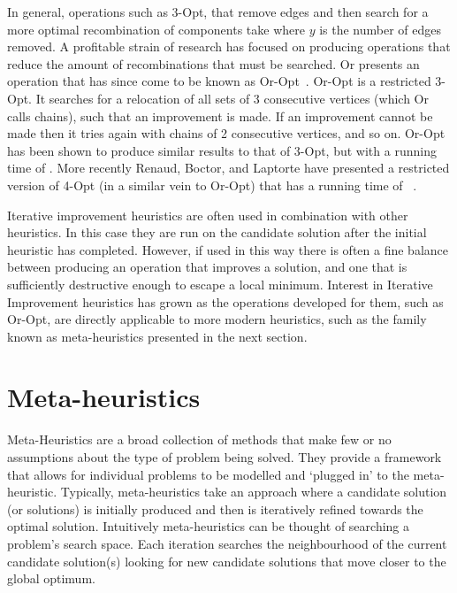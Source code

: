 In general, operations such as 3-Opt, that remove edges and then search for a more optimal recombination of components take  where $y$ is the number of edges removed. A profitable strain of research has focused on producing operations that reduce the amount of recombinations that must be searched. Or presents an operation that has since come to be known as Or-Opt~\cite{Or:1976}. Or-Opt is a restricted 3-Opt. It searches for a relocation of all sets of 3 consecutive vertices (which Or calls chains), such that an improvement is made. If an improvement cannot be made then it tries again with chains of 2 consecutive vertices, and so on. Or-Opt has been shown to produce similar results to that of 3-Opt, but with a running time of . More recently Renaud, Boctor, and Laptorte have presented a restricted version of 4-Opt (in a similar vein to Or-Opt) that has a running time of ~\cite{RBL:1996}. 

Iterative improvement heuristics are often used in combination with other heuristics. In this case they are run on the candidate solution after the initial heuristic has completed. However, if used in this way there is often a fine balance between producing an operation that improves a solution, and one that is sufficiently destructive enough to escape a local minimum. Interest in Iterative Improvement heuristics has grown as the operations developed for them, such as Or-Opt, are directly applicable to more modern heuristics, such as the family known as meta-heuristics presented in the next section. 

\section{Meta-heuristics}
\label{sec:mh}

Meta-Heuristics are a broad collection of methods that make few or no assumptions about the type of problem being solved. They provide a framework that allows for individual problems to be modelled and `plugged in' to the meta-heuristic. Typically,  meta-heuristics take an approach where a candidate solution (or solutions) is initially produced and then is iteratively refined towards the optimal solution. Intuitively meta-heuristics can be thought of searching a problem's search space. Each iteration searches the neighbourhood of the current candidate solution(s) looking for new candidate solutions that move closer to the global optimum.

